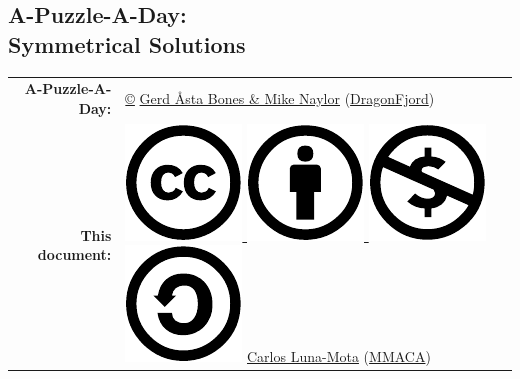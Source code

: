 \documentclass[a4paper, 10pt]{article}
\begin{document}
    \begin{center}
        
        \section*{\Huge A-Puzzle-A-Day:\\Symmetrical Solutions}
        \bigskip
        
        {\large \begin{tabular}{rl}
         \textbf{A-Puzzle-A-Day:} & \href{https://en.wikipedia.org/wiki/All_rights_reserved}{©} %
            \href{https://www.dragonfjord.com/about-us/}{Gerd Åsta Bones \& Mike Naylor} (\href{https://www.dragonfjord.com/}{DragonFjord}) \\[1ex]
        \textbf{This document:} & \href{https://creativecommons.org/licenses/by-nc-sa/4.0/}{%
            \includegraphics[scale=0.16]{cc.pdf}%
            \includegraphics[scale=0.16]{by.pdf}%
            \includegraphics[scale=0.16]{nc.pdf}%
            \includegraphics[scale=0.16]{sa.pdf}} %
            \href{https://github.com/CarlosLunaMota}{Carlos Luna-Mota} (\href{https://mmaca.cat/}{MMACA})
        \end{tabular}}


\end{center}
\end{document}
